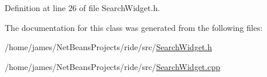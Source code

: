 Definition at line 26 of file Search\-Widget.\-h.



The documentation for this class was generated from the following files\-:\begin{DoxyCompactItemize}
\item 
/home/james/\-Net\-Beans\-Projects/ride/src/\hyperlink{_search_widget_8h}{Search\-Widget.\-h}\item 
/home/james/\-Net\-Beans\-Projects/ride/src/\hyperlink{_search_widget_8cpp}{Search\-Widget.\-cpp}\end{DoxyCompactItemize}

